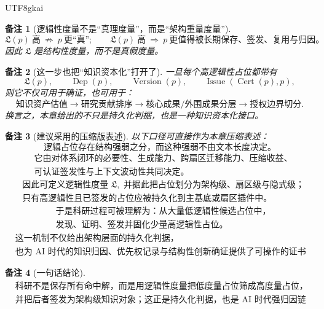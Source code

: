 \documentclass[12pt]{article}
\newtheorem{remark}{备注}[section]
\newcommand{\Cert}{\operatorname{Cert}}
\newcommand{\Issue}{\operatorname{Issue}}
\begin{document}
\begin{CJK*}{UTF8}{gkai}
\begin{remark}[逻辑性度量不是“真理度量”，而是“架构重量度量”]
\[
  \boxed{
    \mathfrak L(p)\ \text{高}
    \ \not\Rightarrow\
    p\ \text{更“真”};
    \qquad
    \mathfrak L(p)\ \text{高}
    \ \Rightarrow\
    p\ \text{更值得被长期保存、签发、复用与归因。}
  }
\]
因此 $\mathfrak L$ 是结构性度量，而不是真假度量。
\end{remark}

\begin{remark}[这一步也把“知识资本化”打开了]
一旦每个高逻辑性占位都带有
\[
  \mathfrak L(p),\qquad
  \operatorname{Dep}(p),\qquad
  \operatorname{Version}(p),\qquad
  \Issue(\Cert(p),p),
\]
则它不仅可用于确证，也可用于：
\[
  \text{知识资产估值}
  \to
  \text{研究贡献排序}
  \to
  \text{核心成果/外围成果分层}
  \to
  \text{授权边界切分}.
\]
换言之，本章给出的不只是持久化判据，也是一种知识资本化接口。
\end{remark}

\begin{remark}[建议采用的压缩版表述]
以下口径可直接作为本章压缩表述：
\[
  \boxed{
    \text{逻辑占位存在结构强弱之分，而这种强弱不由文本长度决定。}
  }
\]
\[
  \boxed{
    \begin{aligned}
      &\text{它由对体系闭环的必要性、生成能力、跨扇区迁移能力、压缩收益、}\\
      &\text{可认证签发性与上下文波动性共同决定。}
    \end{aligned}
  }
\]
\[
  \boxed{
    \begin{aligned}
      &\text{因此可定义逻辑性度量 }\mathfrak L,\text{ 并据此把占位划分为架构级、扇区级与隐式级；}\\
      &\text{只有高逻辑性且已签发的占位应被持久化到主基底或扇区插件中。}
    \end{aligned}
  }
\]
\[
  \boxed{
    \begin{aligned}
      &\text{于是科研过程可被理解为：从大量低逻辑性候选占位中，}\\
      &\text{发现、证明、签发并固化少量高逻辑性占位。}
    \end{aligned}
  }
\]
\[
  \boxed{
    \begin{aligned}
      &\text{这一机制不仅给出架构层面的持久化判据，}\\
      &\text{也为 AI 时代的知识归因、优先权记录与结构性创新确证提供了可操作的证书链基础。}
    \end{aligned}
  }
\]
\end{remark}

\begin{remark}[一句话结论]
\[
  \boxed{
    \begin{aligned}
      &\text{科研不是保存所有命中解，而是用逻辑性度量把低度量占位筛成高度量占位，}\\
      &\text{并把后者签发为架构级知识对象；这正是持久化判据，也是 AI 时代强归因链的基础。}
    \end{aligned}
  }
\]
\end{remark}


\end{CJK*}
\end{document}

